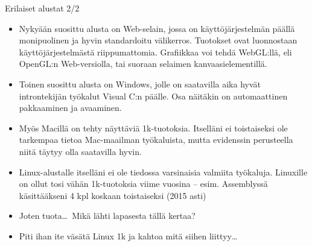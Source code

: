 \documentclass[pdf,10pt]{beamer}
\begin{document}
\begin{frame}{Erilaiset alustat 2/2}
  \begin{itemize}
    \item Nykyään suosittu alusta on Web-selain, jossa on
      käyttöjärjestelmän päällä monipuolinen ja hyvin standardoitu
      välikerros. Tuotokset ovat luonnostaan käyttöjärjestelmästä
      riippumattomia. Grafiikkaa voi tehdä WebGL:llä, eli OpenGL:n
      Web-versiolla, tai suoraan selaimen kanvaasielementillä.
    \item Toinen suosittu alusta on Windows, jolle on saatavilla aika
      hyvät introntekijän työkalut Visual C:n päälle. Osa näitäkin on
      automaattinen pakkaaminen ja avaaminen.
    \item Myös Macillä on tehty näyttäviä 1k-tuotoksia. Itselläni ei
      toistaiseksi ole tarkempaa tietoa Mac-maailman työkaluista,
      mutta evidenssin perusteella niitä täytyy olla saatavilla hyvin.
    \item Linux-alustalle itselläni ei ole tiedossa varsinaisia
      valmiita työkaluja. Linuxille on ollut tosi vähän 1k-tuotoksia
      viime vuosina -- esim. Assemblyssä käsittääkseni 4 kpl koskaan
      toistaiseksi (2015 asti)
    \item Joten tuota\ldots\ Mikä lähti lapasesta tällä kertaa?
    \item Piti ihan ite väsätä Linux 1k ja kahtoa mitä siihen
      liittyy\ldots
  \end{itemize}
\end{frame}
\end{document}
